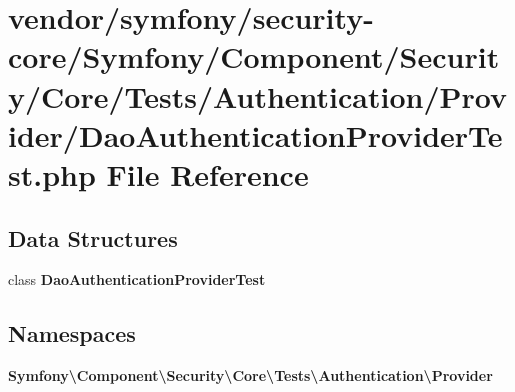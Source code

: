 \section{vendor/symfony/security-\/core/\+Symfony/\+Component/\+Security/\+Core/\+Tests/\+Authentication/\+Provider/\+Dao\+Authentication\+Provider\+Test.php File Reference}
\label{_dao_authentication_provider_test_8php}
\subsection*{Data Structures}
\begin{DoxyCompactItemize}
\item 
class {\bf Dao\+Authentication\+Provider\+Test}
\end{DoxyCompactItemize}
\subsection*{Namespaces}
\begin{DoxyCompactItemize}
\item 
 {\bf Symfony\textbackslash{}\+Component\textbackslash{}\+Security\textbackslash{}\+Core\textbackslash{}\+Tests\textbackslash{}\+Authentication\textbackslash{}\+Provider}
\end{DoxyCompactItemize}
